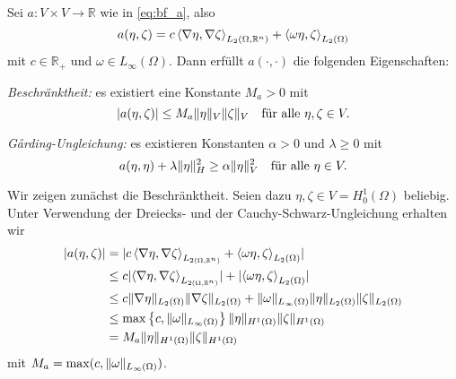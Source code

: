 \begin{Lemma}
    \label{lemma:a_bf_bounded_garding}
    Sei $a \colon V \times V \to \mathbb{R}$ wie in \eqref{eq:bf_a}, also
    \begin{equation}
        a(\eta, \zeta) = c \left\langle\nabla \eta,\nabla \zeta\right\rangle_{L_{2}(\Omega, \mathbb{R}^{n})} + \left\langle\omega \eta,\zeta\right\rangle_{L_{2}(\Omega)}
    \end{equation}
    mit $c \in \mathbb{R}_{+}$ und $\omega \in L_{\infty}(\Omega)$.
    Dann erfüllt $a(\cdot, \cdot)$ die folgenden Eigenschaften:
    \begin{thmenumerate}
        \item \emph{Beschränktheit:} es existiert eine Konstante $M_{a} > 0$ mit
        \begin{equation}
            \lvert a(\eta, \zeta)\rvert \leq M_{a} \lVert\eta\rVert_{V} \lVert\zeta\rVert_{V} \quad \text{für alle}~\eta, \zeta \in V.
        \end{equation}
        \label{lemma:a_bf_bounded_garding:1}
        \item \emph{G\aa{}rding-Ungleichung:} es existieren Konstanten $\alpha > 0$ und $\lambda \geq 0$ mit
        \begin{equation}
                a(\eta, \eta) + \lambda \lVert\eta\rVert_{H}^{2} \geq \alpha \lVert\eta\rVert_{V}^{2} \quad \text{für alle}~\eta \in V.
        \end{equation}
        \label{lemma:a_bf_bounded_garding:2}
    \end{thmenumerate}

    \begin{Beweis}
    Wir zeigen zunächst die Beschränktheit.
    Seien dazu $\eta, \zeta \in V = H^{1}_{0}(\Omega)$ beliebig.
    Unter Verwendung der Dreiecks- und der Cauchy-Schwarz-Ungleichung erhalten wir
    \begin{align}
        \lvert a(\eta, \zeta)\rvert
        &= \lvert c \left\langle\nabla \eta,\nabla \zeta\right\rangle_{L_{2(\Omega, \mathbb{R}^{n})}} + \left\langle\omega \eta,\zeta\right\rangle_{L_{2}(\Omega)}\rvert
        \\&\leq c \lvert\left\langle\nabla \eta,\nabla \zeta\right\rangle_{L_{2(\Omega, \mathbb{R}^{n})}}\rvert + \lvert\left\langle\omega \eta,\zeta\right\rangle_{L_{2}(\Omega)}\rvert
        \\&\leq c \lVert\nabla \eta\rVert_{L_{2}(\Omega)} \lVert\nabla \zeta\rVert_{L_{2}(\Omega)} + \lVert\omega\rVert_{L_{\infty}(\Omega)} \lVert\eta\rVert_{L_{2}(\Omega)} \lVert\zeta\rVert_{L_{2}(\Omega)}
        \\&\leq \max \left\{ c, \lVert\omega\rVert_{L_{\infty}(\Omega)} \right\} \lVert\eta\rVert_{H^{1}(\Omega)} \lVert\zeta\rVert_{H^{1}(\Omega)}
        \\&= M_{a} \lVert\eta\rVert_{H^{1}(\Omega)} \lVert\zeta\rVert_{H^{1}(\Omega)}
    \end{align}
    mit $M_{a} = \max(c, \lVert\omega\rVert_{L_{\infty}(\Omega)} )$.


\end{Beweis}
\end{Lemma}
